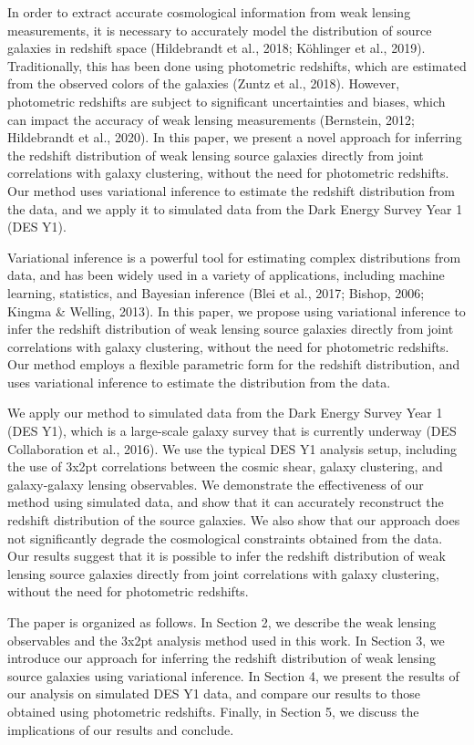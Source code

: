 \documentclass[twocolumn]{aastex631}
\begin{document}
In order to extract accurate cosmological information from weak lensing measurements, it is necessary to accurately model the distribution of source galaxies in redshift space (Hildebrandt et al., 2018; Köhlinger et al., 2019). Traditionally, this has been done using photometric redshifts, which are estimated from the observed colors of the galaxies (Zuntz et al., 2018). However, photometric redshifts are subject to significant uncertainties and biases, which can impact the accuracy of weak lensing measurements (Bernstein, 2012; Hildebrandt et al., 2020). In this paper, we present a novel approach for inferring the redshift distribution of weak lensing source galaxies directly from joint correlations with galaxy clustering, without the need for photometric redshifts. Our method uses variational inference to estimate the redshift distribution from the data, and we apply it to simulated data from the Dark Energy Survey Year 1 (DES Y1).

Variational inference is a powerful tool for estimating complex distributions from data, and has been widely used in a variety of applications, including machine learning, statistics, and Bayesian inference (Blei et al., 2017; Bishop, 2006; Kingma \& Welling, 2013). In this paper, we propose using variational inference to infer the redshift distribution of weak lensing source galaxies directly from joint correlations with galaxy clustering, without the need for photometric redshifts. Our method employs a flexible parametric form for the redshift distribution, and uses variational inference to estimate the distribution from the data.

We apply our method to simulated data from the Dark Energy Survey Year 1 (DES Y1), which is a large-scale galaxy survey that is currently underway (DES Collaboration et al., 2016). We use the typical DES Y1 analysis setup, including the use of 3x2pt correlations between the cosmic shear, galaxy clustering, and galaxy-galaxy lensing observables. We demonstrate the effectiveness of our method using simulated data, and show that it can accurately reconstruct the redshift distribution of the source galaxies. We also show that our approach does not significantly degrade the cosmological constraints obtained from the data. Our results suggest that it is possible to infer the redshift distribution of weak lensing source galaxies directly from joint correlations with galaxy clustering, without the need for photometric redshifts.

The paper is organized as follows. In Section 2, we describe the weak lensing observables and the 3x2pt analysis method used in this work. In Section 3, we introduce our approach for inferring the redshift distribution of weak lensing source galaxies using variational inference. In Section 4, we present the results of our analysis on simulated DES Y1 data, and compare our results to those obtained using photometric redshifts. Finally, in Section 5, we discuss the implications of our results and conclude.
\end{document}
